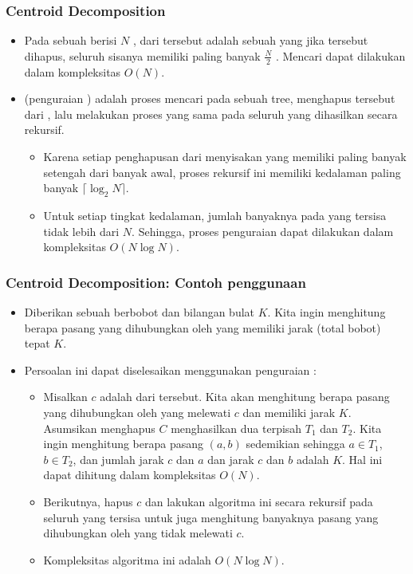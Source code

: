 \begin{frame}
\frametitle{Centroid Decomposition}
\begin{itemize}
  \item Pada sebuah \ftree berisi $N$ \fnode,  dari \ftree tersebut adalah sebuah \fnode yang jika \fnode tersebut dihapus, seluruh \ftree sisanya memiliki paling banyak $\frac{N}{2}$ \fnode. Mencari \fcentroid dapat dilakukan dalam kompleksitas $O(N)$.
  \item {} (penguraian \fcentroid) adalah proses mencari \fcentroid pada sebuah tree, menghapus \fcentroid tersebut dari \ftree, lalu melakukan proses yang sama pada seluruh \ftree yang dihasilkan secara rekursif.
  \begin{itemize}
    \item Karena setiap penghapusan \fcentroid dari \ftree menyisakan \ftree yang memiliki \fnode paling banyak setengah dari banyak \fnode awal, proses rekursif ini memiliki kedalaman paling banyak $\lceil \log_2 N \rceil$.
    \item Untuk setiap tingkat kedalaman, jumlah banyaknya \fnode pada \ftree yang tersisa tidak lebih dari $N$. Sehingga, proses penguraian \fcentroid dapat dilakukan dalam kompleksitas $O(N \log N)$.
  \end{itemize}
\end{itemize}
\end{frame}

\begin{frame}
\frametitle{Centroid Decomposition: Contoh penggunaan}
\begin{itemize}
  \item Diberikan sebuah \ftree berbobot dan bilangan bulat $K$. Kita ingin menghitung berapa pasang \fnode yang dihubungkan oleh \fpath yang memiliki jarak (total bobot) tepat $K$.
  \item Persoalan ini dapat diselesaikan menggunakan penguraian \fcentroid:
  \begin{itemize}
    \item Misalkan \fnode $c$ adalah \fcentroid dari \ftree tersebut. Kita akan menghitung berapa pasang \fnode yang dihubungkan oleh \fpath yang melewati \fnode $c$ dan memiliki jarak $K$. Asumsikan menghapus \fnode $C$ menghasilkan dua \ftree terpisah $T_1$ dan $T_2$. Kita ingin menghitung berapa pasang \fnode $(a, b)$ sedemikian sehingga $a \in T_1$, $b \in T_2$, dan jumlah jarak \fnode $c$ dan \fnode $a$ dan jarak \fnode $c$ dan \fnode $b$ adalah $K$. Hal ini dapat dihitung dalam kompleksitas $O(N)$.
    \item Berikutnya, hapus \fnode $c$ dan lakukan algoritma ini secara rekursif pada seluruh \ftree yang tersisa untuk juga menghitung banyaknya pasang \fnode yang dihubungkan oleh \fpath yang tidak melewati \fnode $c$.
    \item Kompleksitas algoritma ini adalah $O(N \log N)$.
  \end{itemize}
\end{itemize}
\end{frame}



